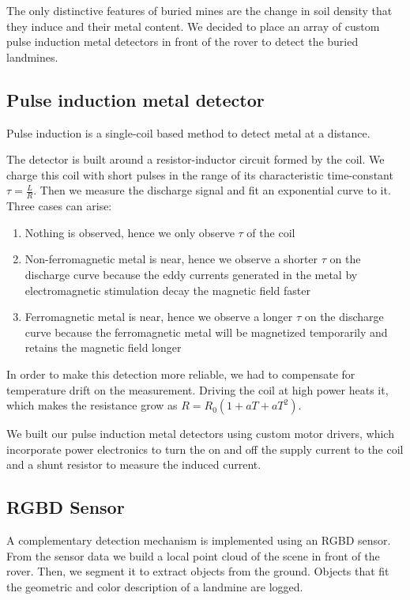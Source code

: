 The only distinctive features of buried mines are the change in soil density that they induce and their metal content.
We decided to place an array of custom pulse induction metal detectors in front of the rover to detect the buried landmines.

\subsection{Pulse induction metal detector}
Pulse induction is a single-coil based method to detect metal at a distance.

The detector is built around a resistor-inductor circuit formed by the coil.
We charge this coil with short pulses in the range of its characteristic time-constant $\tau = \frac{L}{R}$.
Then we measure the discharge signal and fit an exponential curve to it.
Three cases can arise:
\begin{enumerate}
    \item Nothing is observed, hence we only observe $\tau$ of the coil
    \item Non-ferromagnetic metal is near, hence we observe a shorter $\tau$ on the discharge curve because the eddy currents generated in the metal by electromagnetic stimulation decay the magnetic field faster
    \item Ferromagnetic metal is near, hence we observe a longer $\tau$ on the discharge curve because the ferromagnetic metal will be magnetized temporarily and retains the magnetic field longer
\end{enumerate}
In order to make this detection more reliable, we had to compensate for temperature drift on the measurement.
Driving the coil at high power heats it, which makes the resistance grow as $R = R_0 (1 + a T + a T^2)$.

We built our pulse induction metal detectors using custom motor drivers, which incorporate power electronics to turn the on and off the supply current to the coil and a shunt resistor to measure the induced current.

\subsection{RGBD Sensor}
A complementary detection mechanism is implemented using an RGBD sensor.
From the sensor data we build a local point cloud of the scene in front of the rover.
Then, we segment it to extract objects from the ground.
Objects that fit the geometric and color description of a landmine are logged.


